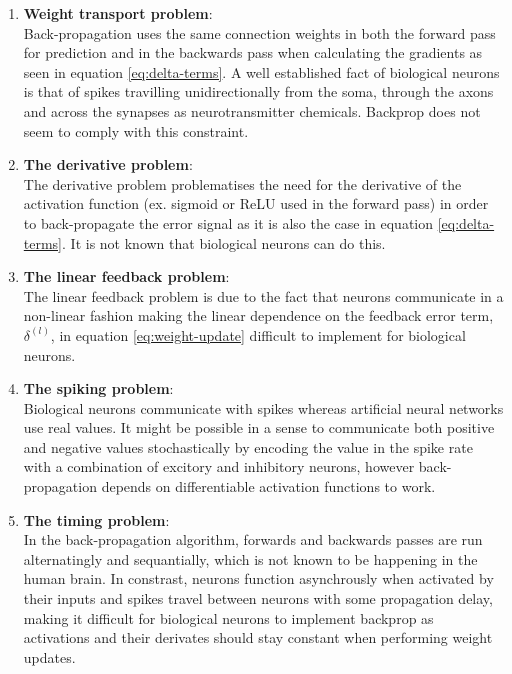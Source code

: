 \documentclass[a4paper,11pt]{article} %
\begin{document}
\begin{enumerate}
  \item \textbf{Weight transport problem}: \vspace{5pt} \\
  Back-propagation uses the same connection weights in both the forward pass for prediction and in the backwards pass when calculating the gradients as seen in equation \ref{eq:delta-terms}. A well established fact of biological neurons is that of spikes travilling unidirectionally from the soma, through the axons and across the synapses as neurotransmitter chemicals. Backprop does not seem to comply with this constraint. %
  \item \textbf{The derivative problem}: \vspace{5pt} \\
  The derivative problem problematises the need for the derivative of the activation function (ex. sigmoid or ReLU used in the forward pass) in order to back-propagate the error signal as it is also the case in equation \ref{eq:delta-terms}. It is not known that biological neurons can do this.
  \item \textbf{The linear feedback problem}: \vspace{5pt} \\
  The linear feedback problem is due to the fact that neurons communicate in a non-linear fashion making the linear dependence on the feedback error term, $\delta^{(l)}$, in equation \ref{eq:weight-update} difficult to implement for biological neurons. 
  \item \textbf{The spiking problem}: \vspace{5pt} \\
  Biological neurons communicate with spikes whereas artificial neural networks use real values. It might be possible in a sense to communicate both positive and negative values stochastically by encoding the value in the spike rate with a combination of excitory and inhibitory neurons, however back-propagation depends on differentiable activation functions to work. %
  \item \textbf{The timing problem}: \vspace{5pt} \\
  In the back-propagation algorithm, forwards and backwards passes are run alternatingly and sequantially, which is not known to be happening in the human brain. In constrast, neurons function asynchrously when activated by their inputs and spikes travel between neurons with some propagation delay, making it difficult for biological neurons to implement backprop as activations and their derivates should stay constant when performing weight updates. 

\end{enumerate}
\end{document}
